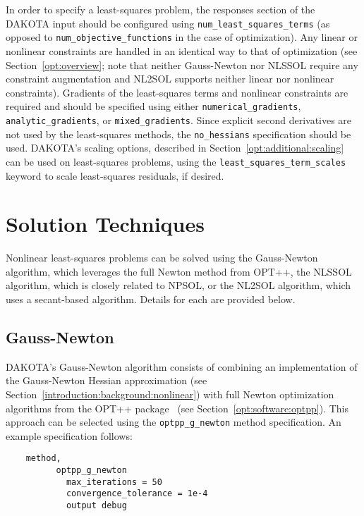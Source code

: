In order to specify a least-squares problem, the responses section of
the DAKOTA input should be configured using
\texttt{num\_least\_squares\_terms} (as opposed to
\texttt{num\_objective\_functions} in the case of optimization). Any
linear or nonlinear constraints are handled in an identical way to
that of optimization (see Section~\ref{opt:overview}; note that
neither Gauss-Newton nor NLSSOL require any constraint augmentation
and NL2SOL supports neither linear nor nonlinear constraints).
Gradients of the least-squares terms and nonlinear constraints are
required and should be specified using either
\texttt{numerical\_gradients}, \texttt{analytic\_gradients}, or
\texttt{mixed\_gradients}. Since explicit second derivatives
are not used by the least-squares methods,
the \texttt{no\_hessians} specification should be used.  DAKOTA's
scaling options, described in Section~\ref{opt:additional:scaling} can
be used on least-squares problems, using the
\texttt{least\_squares\_term\_scales} keyword to scale least-squares
residuals, if desired.

\section{Solution Techniques}\label{nls:solution}

Nonlinear least-squares problems can be solved using the Gauss-Newton
algorithm, which leverages the full Newton method from OPT++, the
NLSSOL algorithm, which is closely related to NPSOL, or the NL2SOL
algorithm, which uses a secant-based algorithm. Details for each are
provided below.

\subsection{Gauss-Newton}\label{nls:solution:gauss}

DAKOTA's Gauss-Newton algorithm consists of combining an
implementation of the Gauss-Newton Hessian approximation (see
Section~\ref{introduction:background:nonlinear}) with full Newton
optimization algorithms from the OPT++ package~\cite{MeOlHoWi07} (see
Section~\ref{opt:software:optpp}). This approach can be selected using
the \texttt{optpp\_g\_newton} method specification. An example
specification follows:
\begin{small}
\begin{verbatim}
    method,
          optpp_g_newton
            max_iterations = 50
            convergence_tolerance = 1e-4
            output debug
\end{verbatim}
\end{small}

